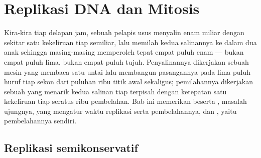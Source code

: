 \chapter{Replikasi DNA dan Mitosis}\label{ch:b1:replication-mitosis}

Kira-kira tiap delapan jam, sebuah  pelapis usus menyalin enam
miliar  dengan sekitar satu kekeliruan tiap semiliar, lalu
memilah kedua salinannya ke dalam dua  anak sehingga masing-masing
memperoleh tepat empat puluh enam  --- bukan empat puluh lima,
bukan empat puluh tujuh. Penyalinannya dikerjakan sebuah mesin yang
membaca satu untai lalu membangun pasangannya pada lima puluh huruf tiap
sekon dari puluhan ribu titik awal sekaligus; pemilahannya dikerjakan
sebuah   yang menarik kedua salinan tiap 
terpisah dengan ketepatan satu kekeliruan tiap seratus ribu pembelahan.
Bab ini memerikan  beserta , masalah ujungnya,
 yang mengatur waktu replikasi serta pembelahannya, dan ,
yaitu pembelahannya sendiri.

\section{Replikasi semikonservatif}


